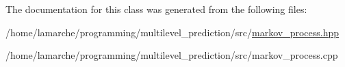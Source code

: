 The documentation for this class was generated from the following files\-:\begin{DoxyCompactItemize}
\item 
/home/lamarche/programming/multilevel\-\_\-prediction/src/\hyperlink{markov__process_8hpp}{markov\-\_\-process.\-hpp}\item 
/home/lamarche/programming/multilevel\-\_\-prediction/src/markov\-\_\-process.\-cpp\end{DoxyCompactItemize}
